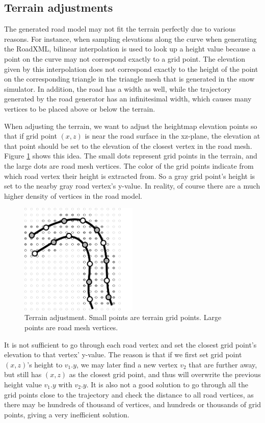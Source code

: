 \subsection{Terrain adjustments}
The generated road model may not fit the terrain perfectly due to various reasons. For instance, when sampling elevations along the curve when generating the RoadXML, bilinear interpolation is used to look up a height value because a point on the curve may not correspond exactly to a grid point. The elevation given by this interpolation does not correspond exactly to the height of the point on the corresponding triangle in the triangle mesh that is generated in the snow simulator. In addition, the road has a width as well, while the trajectory generated by the road generator has an infinitesimal width, which causes many vertices to be placed above or below the terrain.

When adjusting the terrain, we want to adjust the heightmap elevation points so that if grid point $(x,z)$ is near the road surface in the xz-plane, the elevation at that point should be set to the elevation of the closest vertex in the road mesh. Figure \ref{fig:terrain_adjustment} shows this idea. The small dots represent grid points in the terrain, and the large dots are road mesh vertices. The color of the grid points indicate from which road vertex their height is extracted from. So a gray grid point's height is set to the nearby gray road vertex's y-value. In reality, of course there are a much higher density of vertices in the road model.

\begin{figure}[ht]
\centering
\includegraphics[width=0.5\textwidth]{figure/terrain_adjustment}
\caption{Terrain adjustment. Small points are terrain grid points. Large points are road mesh vertices.}
\label{fig:terrain_adjustment}
\end{figure}

It is not sufficient to go through each road vertex and set the closest grid point's elevation to that vertex' y-value. The reason is that if we first set grid point $(x,z)$'s height to $v_1.y$, we may later find a new vertex $v_2$ that are further away, but still has $(x,z)$ as the closest grid point, and thus will overwrite the previous height value $v_1.y$ with $v_2.y$. It is also not a good solution to go through all the grid points close to the trajectory and check the distance to all road vertices, as there may be hundreds of thousand of vertices, and hundreds or thousands of grid points, giving a very inefficient solution. 

